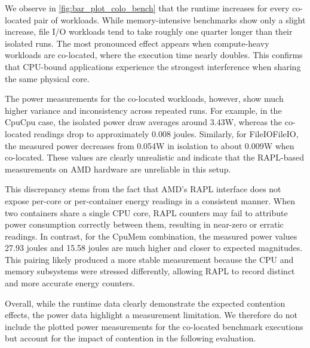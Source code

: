 We observe in \ref{fig:bar_plot_colo_bench} that the runtime increases for every co-located pair of workloads. While memory-intensive benchmarks show only a slight increase, file I/O workloads tend to take roughly one quarter longer than their isolated runs. The most pronounced effect appears when compute-heavy workloads are co-located, where the execution time nearly doubles. This confirms that CPU-bound applications experience the strongest interference when sharing the same physical core.

The power measurements for the co-located workloads, however, show much higher variance and inconsistency across repeated runs. For example, in the CpuCpu case, the isolated power draw averages around 3.43W, whereas the co-located readings drop to approximately 0.008 joules. Similarly, for FileIOFileIO, the measured power decreases from 0.054W in isolation to about 0.009W when co-located. These values are clearly unrealistic and indicate that the RAPL-based measurements on AMD hardware are unreliable in this setup.

This discrepancy stems from the fact that AMD’s RAPL interface does not expose per-core or per-container energy readings in a consistent manner. When two containers share a single CPU core, RAPL counters may fail to attribute power consumption correctly between them, resulting in near-zero or erratic readings. In contrast, for the CpuMem combination, the measured power values 27.93 joules and 15.58 joules are much higher and closer to expected magnitudes. This pairing likely produced a more stable measurement because the CPU and memory subsystems were stressed differently, allowing RAPL to record distinct and more accurate energy counters.

Overall, while the runtime data clearly demonstrate the expected contention effects, the power data highlight a measurement limitation. We therefore do not include the plotted power measurements for the co-located benchmark executions but account for the impact of contention in the following evaluation.

